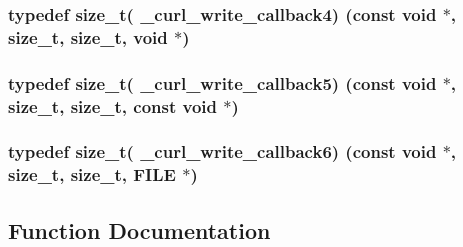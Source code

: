 \subsubsection[{\texorpdfstring{\+\_\+curl\+\_\+write\+\_\+callback4}{_curl_write_callback4}}]{\setlength{\rightskip}{0pt plus 5cm}typedef size\+\_\+t( \+\_\+curl\+\_\+write\+\_\+callback4) (const void $\ast$, size\+\_\+t, size\+\_\+t, void $\ast$)}\hypertarget{typecheck-gcc_8h_a8c3b7fedfa10f92d318198423336183d}{}\label{typecheck-gcc_8h_a8c3b7fedfa10f92d318198423336183d}
\subsubsection[{\texorpdfstring{\+\_\+curl\+\_\+write\+\_\+callback5}{_curl_write_callback5}}]{\setlength{\rightskip}{0pt plus 5cm}typedef size\+\_\+t( \+\_\+curl\+\_\+write\+\_\+callback5) (const void $\ast$, size\+\_\+t, size\+\_\+t, const void $\ast$)}\hypertarget{typecheck-gcc_8h_adbc7b265ad924bbb086fe32e0b52935f}{}\label{typecheck-gcc_8h_adbc7b265ad924bbb086fe32e0b52935f}
\subsubsection[{\texorpdfstring{\+\_\+curl\+\_\+write\+\_\+callback6}{_curl_write_callback6}}]{\setlength{\rightskip}{0pt plus 5cm}typedef size\+\_\+t( \+\_\+curl\+\_\+write\+\_\+callback6) (const void $\ast$, size\+\_\+t, size\+\_\+t, F\+I\+LE $\ast$)}\hypertarget{typecheck-gcc_8h_a7d38c5964bcf80455b4ac9fccb3bc4c3}{}\label{typecheck-gcc_8h_a7d38c5964bcf80455b4ac9fccb3bc4c3}


\subsection{Function Documentation}
